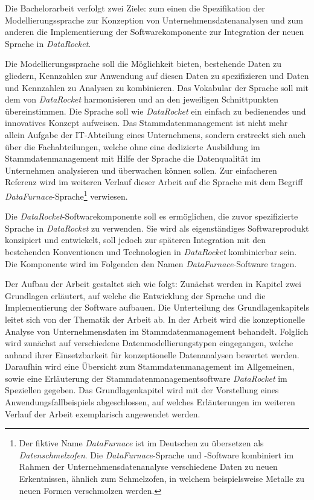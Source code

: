 \documentclass[
  language=german, %
  type=bachelor,%
  ngerman
]{isthesis}
\begin{document}
\begin{content}
  Die Bachelorarbeit verfolgt zwei Ziele: zum einen die Spezifikation der
  Modellierungssprache zur Konzeption von Unternehmensdatenanalysen und zum
  anderen die Implementierung der Softwarekomponente zur Integration der neuen
  Sprache in \textit{DataRocket}.

  Die Modellierungssprache soll die Möglichkeit bieten, bestehende Daten zu
  gliedern, Kennzahlen zur Anwendung auf diesen Daten zu spezifizieren und
  Daten und Kennzahlen zu Analysen zu kombinieren. Das Vokabular der Sprache
  soll mit dem von \textit{DataRocket} harmonisieren und an den jeweiligen
  Schnittpunkten übereinstimmen.  Die Sprache soll wie \textit{DataRocket} ein
  einfach zu bedienendes und innovatives Konzept aufweisen. Das
  Stammdatenmanagement ist nicht mehr allein Aufgabe der IT-Abteilung eines
  Unternehmens, sondern erstreckt sich auch über die
  Fachabteilungen, welche ohne eine dedizierte Ausbildung im
  Stammdatenmanagement mit Hilfe der Sprache die Datenqualität im Unternehmen
  analysieren und überwachen können sollen. Zur einfacheren Referenz wird im
  weiteren Verlauf dieser Arbeit auf die Sprache mit dem Begriff
  \textit{DataFurnace}-Sprache\footnote{Der fiktive Name \textit{DataFurnace}
  ist im Deutschen zu übersetzen als \textit{Datenschmelzofen}. Die
  \textit{DataFurnace}-Sprache und -Software kombiniert im Rahmen der
  Unternehmensdatenanalyse verschiedene Daten zu neuen Erkentnissen, ähnlich
  zum Schmelzofen, in welchem beispielsweise Metalle zu neuen Formen
  verschmolzen werden.}  verwiesen.

  Die \textit{DataRocket}-Softwarekomponente soll es ermöglichen, die zuvor
  spezifizierte Sprache in \textit{DataRocket} zu verwenden. Sie wird als
  eigenständiges Softwareprodukt konzipiert und entwickelt, soll jedoch zur
  späteren Integration mit den bestehenden Konventionen und Technologien in
  \textit{DataRocket} kombinierbar sein. Die Komponente wird im Folgenden den
  Namen \textit{DataFurnace}-Software  tragen.

   Der Aufbau der Arbeit gestaltet sich wie folgt: Zunächst werden in Kapitel
   zwei Grundlagen erläutert, auf welche die Entwicklung der Sprache und die
   Implementierung der Software aufbauen. Die Unterteilung des
   Grundlagenkapitels leitet sich von der Thematik der Arbeit ab. In der Arbeit
   wird die konzeptionelle Analyse von Unternehmensdaten im
   Stammdatenmanagement behandelt. Folglich wird zunächst auf verschiedene
   Datenmodellierungstypen eingegangen, welche anhand ihrer Einsetzbarkeit für
   konzeptionelle Datenanalysen bewertet werden. Daraufhin wird eine Übersicht
   zum Stammdatenmanagement im Allgemeinen, sowie eine Erläuterung der
   Stammdatenmanagementsoftware \textit{DataRocket} im Speziellen gegeben. Das
   Grundlagenkapitel wird mit der Vorstellung eines Anwendungsfallbeispiels
   abgeschlossen, auf welches Erläuterungen im weiteren Verlauf der Arbeit
   exemplarisch angewendet werden.


\end{content}
\end{document}
